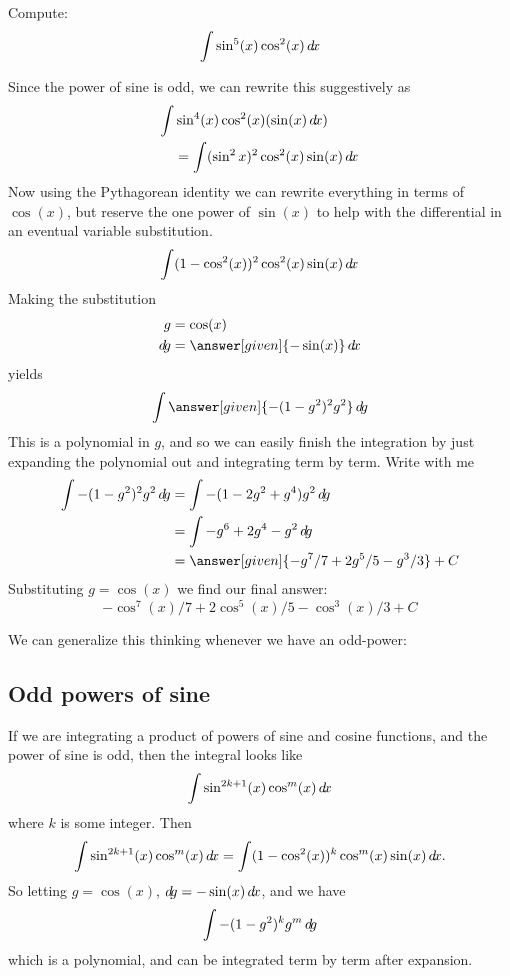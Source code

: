 \documentclass{ximera}
\begin{document}
\begin{example}
  Compute:
  \[
  \int \sin^5(x) \cos^2(x) \mathop{}\!d\! x
  \]
  \begin{explanation}
    Since the power of sine is odd, we can rewrite this suggestively as
    \begin{align*}
    \int &\sin^4(x) \cos^2(x) (\sin(x) \mathop{}\!d\! x) \\
    &= \int (\sin^2x)^2 \cos^2(x) \sin(x) \mathop{}\!d\! x
    \end{align*}
    Now using the Pythagorean identity we can rewrite everything in
    terms of $\cos(x)$, but reserve the one power of $\sin(x)$ to help
    with the differential in an eventual variable substitution.
    \[
    \int (1-\cos^2(x))^2 \cos^2(x) \sin(x) \mathop{}\!d\! x
    \]
    Making the substitution
    \begin{align*}
      g &= \cos(x)\\
      \d g &=\answer[given]{-\sin(x)} \d x
    \end{align*}
    yields
    \[
    \int \answer[given]{-(1-g^2)^2 g^2} \d g
    \]
    This is a polynomial in $g$, and so we can easily finish the
    integration by just expanding the polynomial out and integrating
    term by term. Write with me
    \begin{align*}
      \int {-(1-g^2)^2 g^2} \d g &= \int -(1-2g^2+g^4)g^2\d g\\
      &= \int-g^6 + 2g^4-g^2 \d g\\
      &=\answer[given]{-g^7/7 + 2g^5/5 - g^3/3}+C
    \end{align*}
    Substituting $g = \cos(x)$ we find our final answer:
    \[
    -\cos^7(x)/7 + 2\cos^5(x)/5 - \cos^3(x)/3+C
    \]
  \end{explanation}
\end{example}

We can generalize this thinking whenever we have an odd-power:

\subsection{Odd powers of sine}

If we are integrating a product of powers of sine and cosine
functions, and the power of sine is odd, then the integral looks like
\[
\int \sin^{2k+1}(x) \cos^m(x) \mathop{}\!d\! x
\]
where $k$ is some integer.  Then
\[
\int \sin^{2k+1}(x) \cos^m(x) \mathop{}\!d\! x = \int (1-\cos^2(x))^k \cos^m(x) \sin(x)\mathop{}\!d\! x.
\]
So letting $g = \cos(x)$, $\mathop{}\!d\! g =-\sin(x) \mathop{}\!d\! x$, and we have
\[
\int -(1-g^2)^k g^m \mathop{}\!d\! g
\]
which is a polynomial, and can be integrated term by term after
expansion.
\end{document}
